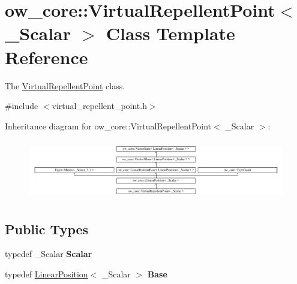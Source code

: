\hypertarget{classow__core_1_1VirtualRepellentPoint}{}\section{ow\+\_\+core\+:\+:Virtual\+Repellent\+Point$<$ \+\_\+\+Scalar $>$ Class Template Reference}
\label{classow__core_1_1VirtualRepellentPoint}


The \hyperlink{classow__core_1_1VirtualRepellentPoint}{Virtual\+Repellent\+Point} class.  




{\ttfamily \#include $<$virtual\+\_\+repellent\+\_\+point.\+h$>$}

Inheritance diagram for ow\+\_\+core\+:\+:Virtual\+Repellent\+Point$<$ \+\_\+\+Scalar $>$\+:\begin{figure}[H]
\begin{center}
\leavevmode
\includegraphics[height=2.629108cm]{d4/d4c/classow__core_1_1VirtualRepellentPoint}
\end{center}
\end{figure}
\subsection*{Public Types}
\begin{DoxyCompactItemize}
\item 
typedef \+\_\+\+Scalar {\bfseries Scalar}\hypertarget{classow__core_1_1VirtualRepellentPoint_ac8331a90e87493eeafc3495f084c19ca}{}\label{classow__core_1_1VirtualRepellentPoint_ac8331a90e87493eeafc3495f084c19ca}

\item 
typedef \hyperlink{classow__core_1_1LinearPosition}{Linear\+Position}$<$ \+\_\+\+Scalar $>$ {\bfseries Base}\hypertarget{classow__core_1_1VirtualRepellentPoint_a1f07efd6eb464917ab58f0b017496bda}{}\label{classow__core_1_1VirtualRepellentPoint_a1f07efd6eb464917ab58f0b017496bda}

\end{DoxyCompactItemize}
